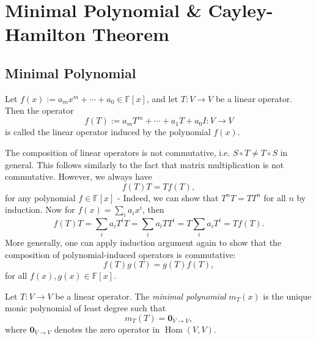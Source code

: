 \chapter{Minimal Polynomial \& Cayley-Hamilton Theorem}
\section{ Minimal Polynomial}

\begin{definition}
Let \( f(x) := a_m x^m + \cdots + a_0 \in \mathbb{F}[x] \), and let \( T : V \to V \) be a linear operator. Then the operator
\[
f(T) := a_m T^m + \cdots + a_1 T + a_0 I : V \to V
\]
is called the linear operator induced by the polynomial \( f(x) \).
\end{definition}

The composition of linear operators is not commutative, i.e. \( S \circ T \neq T \circ S \) in general. This follows similarly to the fact that matrix multiplication is not commutative. However, we always have
  \[
  f(T) T = T f(T),
  \]
for any polynomial \( f \in \mathbb{F}[x] \) - Indeed, we can show that \( T^n T = T T^n \) for all \( n \) by induction. Now for \( f(x) = \sum_i a_i x^i \), then
  \[
  f(T) T = \sum_i a_i T^i T = \sum_i a_i T T^i = T \sum_i a_i T^i = T f(T). 
  \]
More generally, one can apply induction argument again to show that the composition of polynomial-induced operators is commutative:
  \[
  f(T) g(T) = g(T) f(T),
  \]
for all \( f(x), g(x) \in \mathbb{F}[x] \).

\begin{definition}
Let \( T : V \to V \) be a linear operator. The \emph{minimal polynomial} \( m_T(x) \) is the unique monic polynomial of least degree such that
\[
m_T(T) = \mathbf{0}_{V \to V},
\]
where \( \mathbf{0}_{V \to V} \) denotes the zero operator in \( \operatorname{Hom}(V, V) \).
\end{definition}


